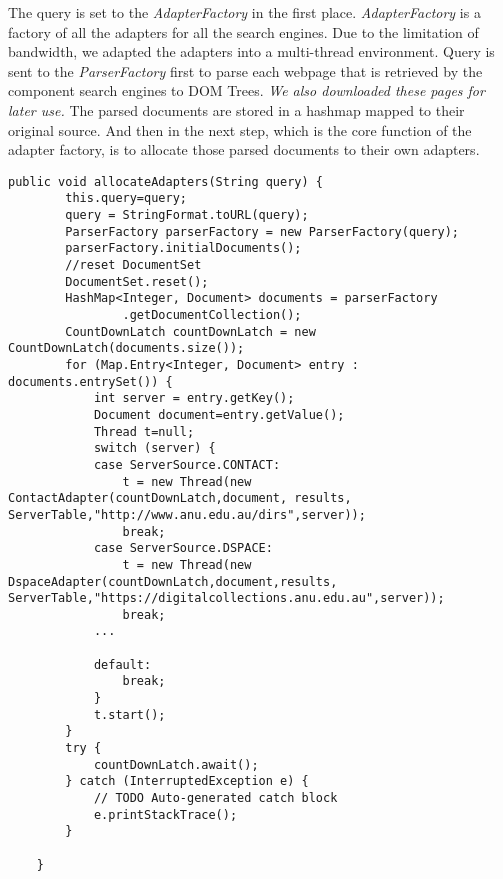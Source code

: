 The query is set to the \textit{AdapterFactory} in the first place. \textit{AdapterFactory} is a factory of all the adapters for all the search engines. Due to the limitation of bandwidth, we adapted the adapters into a multi-thread environment. Query is sent to the \textit{ParserFactory} first to parse each webpage that is retrieved by the component search engines to DOM Trees. \textit{We also downloaded these pages for later use.} The parsed documents are stored in a hashmap mapped to their original source. And then in the next step, which is the core function of the adapter factory, is to allocate those parsed documents to their own adapters. 
\lstset{escapechar=@,style=customc}
\begin{lstlisting}[caption={Code for AdapterFactory},label=cd:af]
public void allocateAdapters(String query) {
		this.query=query;
		query = StringFormat.toURL(query);
		ParserFactory parserFactory = new ParserFactory(query);
		parserFactory.initialDocuments();
		//reset DocumentSet
		DocumentSet.reset();
		HashMap<Integer, Document> documents = parserFactory
				.getDocumentCollection();
		CountDownLatch countDownLatch = new CountDownLatch(documents.size());
		for (Map.Entry<Integer, Document> entry : documents.entrySet()) {
			int server = entry.getKey();
			Document document=entry.getValue();
			Thread t=null;
			switch (server) {
			case ServerSource.CONTACT:
				t = new Thread(new ContactAdapter(countDownLatch,document, results, ServerTable,"http://www.anu.edu.au/dirs",server));
				break;
			case ServerSource.DSPACE:
				t = new Thread(new DspaceAdapter(countDownLatch,document,results, ServerTable,"https://digitalcollections.anu.edu.au",server));
				break;
			...			
			
			default:
				break;
			}
			t.start();
		}
		try {
			countDownLatch.await();
		} catch (InterruptedException e) {
			// TODO Auto-generated catch block
			e.printStackTrace();
		}

	}

\end{lstlisting}

